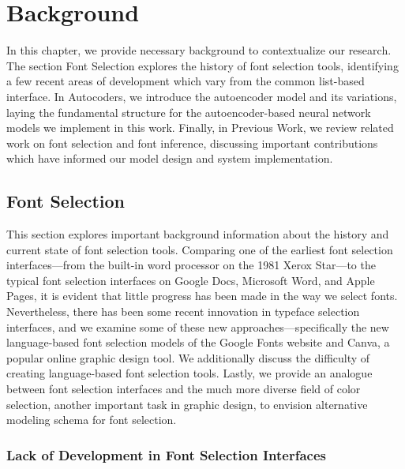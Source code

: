 \chapter{Background}
\label{chap:background}

In this chapter, we provide necessary background to contextualize our research. The section Font Selection explores the history of font selection tools, identifying a few recent areas of development which vary from the common list-based interface. In Autocoders, we introduce the autoencoder model and its variations, laying the fundamental structure for the autoencoder-based neural network models we implement in this work. Finally, in Previous Work, we review related work on font selection and font inference, discussing important contributions which have informed our model design and system implementation.

\section{Font Selection}

This section explores important background information about the history and current state of font selection tools. Comparing one of the earliest font selection interfaces---from the built-in word processor on the 1981 Xerox Star---to the typical font selection interfaces on Google Docs, Microsoft Word, and Apple Pages, it is evident that little progress has been made in the way we select fonts. Nevertheless, there has been some recent innovation in typeface selection interfaces, and we examine some of these new approaches---specifically the new language-based font selection models of the Google Fonts website and Canva, a popular online graphic design tool. We additionally discuss the difficulty of creating language-based font selection tools. Lastly, we provide an analogue between font selection interfaces and the much more diverse field of color selection, another important task in graphic design, to envision alternative modeling schema for font selection.

\subsection{Lack of Development in Font Selection Interfaces}

